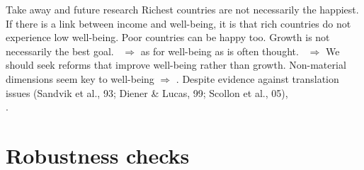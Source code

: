 \documentclass[aspectratio=169,xcolor=dvipsnames, 11pt,mathserif]{beamer}
\begin{document}
\begin{frame}{Take away and future research}
    \bbvsp
    \ip {}
    \ip Richest countries are not necessarily the happiest.
    \ip If there is a link between income and well-being, it is that rich countries do not experience low well-being.
    \ip Poor countries can be happy too. Growth is not necessarily the best goal.
    \ip ~$\Rightarrow$  as  for well-being as is often thought.
    \ip ~$\Rightarrow$ We should seek reforms that improve well-being rather than growth.
    \ip Non-material dimensions seem key to well-being $\Rightarrow$ . %
    \ip Despite evidence against translation issues (Sandvik et al., 93; Diener \& Lucas, 99; Scollon et al., 05), \\.
    \ee
\end{frame}

\appendix

\section{Robustness checks}
\end{document}
